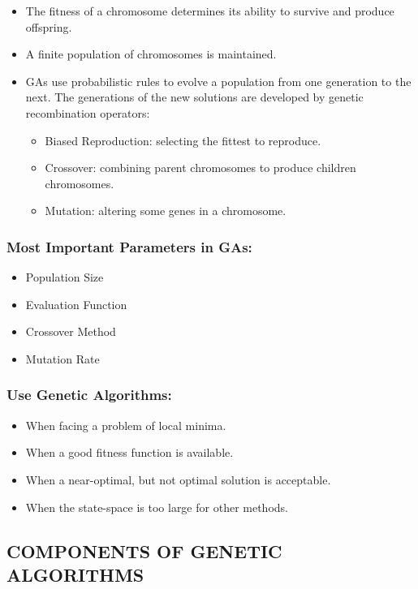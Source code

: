 \begin{itemize}
	\item The fitness of a chromosome determines its ability to survive and produce offspring.
	\item A finite population of chromosomes is maintained.
	\item GAs  use  probabilistic  rules  to  evolve  a  population from  one  generation to the next.  The generations of the new solutions are developed by genetic recombination operators:
	\begin{itemize}
		\item Biased Reproduction: selecting the fittest to reproduce.
		\item Crossover: combining parent chromosomes to produce children chromosomes.
		\item Mutation: altering some genes in a chromosome.
	\end{itemize}
\end{itemize}

\subsubsection*{Most Important Parameters in GAs:}
\begin{itemize}
	\item Population Size
	\item Evaluation Function
	\item Crossover Method
	\item Mutation Rate
\end{itemize}

\subsubsection*{Use Genetic Algorithms:}
\begin{itemize}
	\item When facing a problem of local minima.
	\item When a good fitness function is available.
	\item When a near-optimal, but not optimal solution is acceptable.
	\item When the state-space is too large for other methods.
\end{itemize}

\subsection{COMPONENTS OF GENETIC ALGORITHMS}
